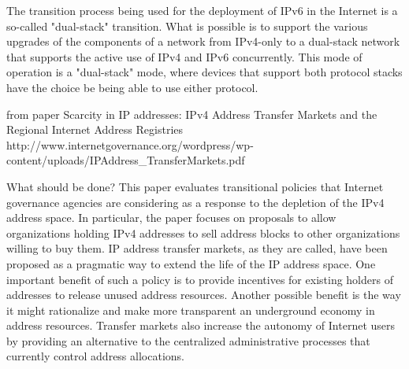\documentclass[11pt]{report}
\begin{document}
The transition process being used for the deployment of IPv6 in the Internet is a so-called
"dual-stack" transition. What is possible is to support the various upgrades of the components of a network
from IPv4-only to a dual-stack network that supports the active use of IPv4 and IPv6 concurrently. This
mode of operation is a "dual-stack" mode, where devices that support both protocol stacks have the choice
be being able to use either protocol.


from paper Scarcity in IP addresses: IPv4 Address Transfer Markets and the Regional Internet Address Registries http://www.internetgovernance.org/wordpress/wp-content/uploads/IPAddress\_TransferMarkets.pdf

What should be done? This paper evaluates transitional policies that Internet
governance agencies are considering as a response to the depletion of the IPv4 address
space. In particular, the paper focuses on proposals to allow organizations holding IPv4
addresses to sell address blocks to other organizations willing to buy them. IP address
transfer markets, as they are called, have been proposed as a pragmatic way to extend
the life of the IP address space. One important benefit of such a policy is to provide
incentives for existing holders of addresses to release unused address resources.
Another possible benefit is the way it might rationalize and make more transparent an
underground economy in address resources. Transfer markets also increase the
autonomy of Internet users by providing an alternative to the centralized administrative
processes that currently control address allocations. 
\end{document}

